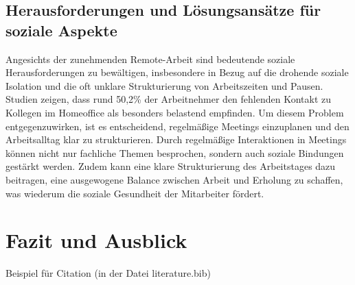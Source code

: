 \documentclass[runningheads]{llncs}
\begin{document}
\subsection{Herausforderungen und Lösungsansätze für soziale Aspekte}

Angesichts der zunehmenden Remote-Arbeit sind bedeutende soziale Herausforderungen zu bewältigen, insbesondere in Bezug auf die drohende soziale Isolation und die oft unklare Strukturierung von Arbeitszeiten und Pausen. Studien zeigen, dass rund 50,2\% der Arbeitnehmer den fehlenden Kontakt zu Kollegen im Homeoffice als besonders belastend empfinden. \cite{statista_belastende_2021} Um diesem Problem entgegenzuwirken, ist es entscheidend, regelmäßige Meetings einzuplanen und den Arbeitsalltag klar zu strukturieren. Durch regelmäßige Interaktionen in Meetings können nicht nur fachliche Themen besprochen, sondern auch soziale Bindungen gestärkt werden. Zudem kann eine klare Strukturierung des Arbeitstages dazu beitragen, eine ausgewogene Balance zwischen Arbeit und Erholung zu schaffen, was wiederum die soziale Gesundheit der Mitarbeiter fördert. \cite{schneider_homeoffice_2022}

\section{Fazit und Ausblick}

Beispiel für Citation\cite{noauthor_internet-konferenz_2021}
(in der Datei literature.bib)




\end{document}

